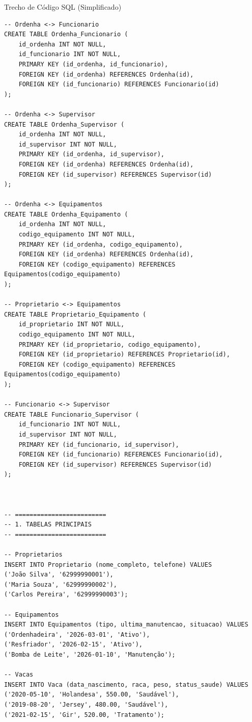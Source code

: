 \documentclass[12pt]{article}
\begin{document}
\begin{block}{Trecho de Código SQL (Simplificado)}
\begin{verbatim}
-- Ordenha <-> Funcionario
CREATE TABLE Ordenha_Funcionario (
    id_ordenha INT NOT NULL,
    id_funcionario INT NOT NULL,
    PRIMARY KEY (id_ordenha, id_funcionario),
    FOREIGN KEY (id_ordenha) REFERENCES Ordenha(id),
    FOREIGN KEY (id_funcionario) REFERENCES Funcionario(id)
);

-- Ordenha <-> Supervisor
CREATE TABLE Ordenha_Supervisor (
    id_ordenha INT NOT NULL,
    id_supervisor INT NOT NULL,
    PRIMARY KEY (id_ordenha, id_supervisor),
    FOREIGN KEY (id_ordenha) REFERENCES Ordenha(id),
    FOREIGN KEY (id_supervisor) REFERENCES Supervisor(id)
);

-- Ordenha <-> Equipamentos
CREATE TABLE Ordenha_Equipamento (
    id_ordenha INT NOT NULL,
    codigo_equipamento INT NOT NULL,
    PRIMARY KEY (id_ordenha, codigo_equipamento),
    FOREIGN KEY (id_ordenha) REFERENCES Ordenha(id),
    FOREIGN KEY (codigo_equipamento) REFERENCES Equipamentos(codigo_equipamento)
);

-- Proprietario <-> Equipamentos
CREATE TABLE Proprietario_Equipamento (
    id_proprietario INT NOT NULL,
    codigo_equipamento INT NOT NULL,
    PRIMARY KEY (id_proprietario, codigo_equipamento),
    FOREIGN KEY (id_proprietario) REFERENCES Proprietario(id),
    FOREIGN KEY (codigo_equipamento) REFERENCES Equipamentos(codigo_equipamento)
);

-- Funcionario <-> Supervisor
CREATE TABLE Funcionario_Supervisor (
    id_funcionario INT NOT NULL,
    id_supervisor INT NOT NULL,
    PRIMARY KEY (id_funcionario, id_supervisor),
    FOREIGN KEY (id_funcionario) REFERENCES Funcionario(id),
    FOREIGN KEY (id_supervisor) REFERENCES Supervisor(id)
);



-- =========================
-- 1. TABELAS PRINCIPAIS
-- =========================

-- Proprietarios
INSERT INTO Proprietario (nome_completo, telefone) VALUES
('João Silva', '62999990001'),
('Maria Souza', '62999990002'),
('Carlos Pereira', '62999990003');

-- Equipamentos
INSERT INTO Equipamentos (tipo, ultima_manutencao, situacao) VALUES
('Ordenhadeira', '2026-03-01', 'Ativo'),
('Resfriador', '2026-02-15', 'Ativo'),
('Bomba de Leite', '2026-01-10', 'Manutenção');

-- Vacas
INSERT INTO Vaca (data_nascimento, raca, peso, status_saude) VALUES
('2020-05-10', 'Holandesa', 550.00, 'Saudável'),
('2019-08-20', 'Jersey', 480.00, 'Saudável'),
('2021-02-15', 'Gir', 520.00, 'Tratamento');


\end{verbatim}
\end{block}
\end{document}
